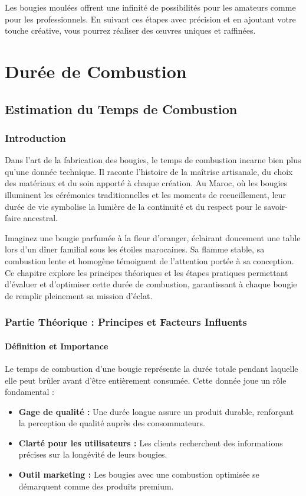 \documentclass[11pt,fleqn,onecolumn,oneside]{book}
\begin{document}
\begin{remark}
Les bougies moulées offrent une infinité de possibilités pour les amateurs comme pour les professionnels. En suivant ces étapes avec précision et en ajoutant votre touche créative, vous pourrez réaliser des œuvres uniques et raffinées.
\end{remark}

\part{Durée de Combustion}
\chapter{Estimation du Temps de Combustion}

\section{Introduction}

Dans l’art de la fabrication des bougies, le temps de combustion incarne bien plus qu’une donnée technique. Il raconte l’histoire de la maîtrise artisanale, du choix des matériaux et du soin apporté à chaque création. Au Maroc, où les bougies illuminent les cérémonies traditionnelles et les moments de recueillement, leur durée de vie symbolise la lumière de la continuité et du respect pour le savoir-faire ancestral.

Imaginez une bougie parfumée à la fleur d’oranger, éclairant doucement une table lors d’un dîner familial sous les étoiles marocaines. Sa flamme stable, sa combustion lente et homogène témoignent de l’attention portée à sa conception. Ce chapitre explore les principes théoriques et les étapes pratiques permettant d’évaluer et d’optimiser cette durée de combustion, garantissant à chaque bougie de remplir pleinement sa mission d’éclat.

\section{Partie Théorique : Principes et Facteurs Influents}

\subsection*{Définition et Importance}

Le temps de combustion d’une bougie représente la durée totale pendant laquelle elle peut brûler avant d’être entièrement consumée. Cette donnée joue un rôle fondamental :
\begin{itemize}
    \item \textbf{Gage de qualité :} Une durée longue assure un produit durable, renforçant la perception de qualité auprès des consommateurs.
    \item \textbf{Clarté pour les utilisateurs :} Les clients recherchent des informations précises sur la longévité de leurs bougies.
    \item \textbf{Outil marketing :} Les bougies avec une combustion optimisée se démarquent comme des produits premium.
\end{itemize}
\end{document}
